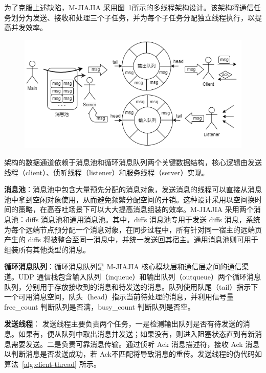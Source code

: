 {\begin{enumerate}[label=\arabic*.]
              为了克服上述缺陷，M-JIAJIA 采用图~\ref{fig:mjiajia-multithread}所示的多线程架构设计。该架构将通信任务划分为发送、接收和处理三个子任务，并为每个子任务分配独立线程执行，以提高并发效率。
              \begin{figure}[H]
                  \centering
                  \includegraphics[width=1.0\textwidth]{Img/Multithread-arch.png}
                  \label{fig:mjiajia-multithread}
              \end{figure}

              架构的数据通道依赖于消息池和循环消息队列两个关键数据结构，核心逻辑由发送线程（client）、侦听线程（listener）和服务线程（server）实现。

              \textbf{消息池}：消息池中包含大量预先分配的消息对象，发送消息的线程可以直接从消息池中拿到空闲对象使用，从而避免频繁分配空间的开销。这种设计采用以空间换时间的策略，在高吞吐场景下可以大大提高消息组装的效率。M-JIAJIA 采用两个消息池：diffs 消息池和通用消息池。其中，diffs 消息池专用于发送 diffs 消息，系统为每个远端节点预分配一个消息对象，在同步过程中，所有针对同一宿主的远端页产生的 diffs 将被整合至同一消息中，并统一发送回其宿主。通用消息池则可用于组装所有其他类型的消息。

              \textbf{循环消息队列}：循环消息队列是 M-JIAJIA 核心模块层和通信层之间的通信渠道。UDP 通信栈包含输入队列（inqueue）和输出队列（outqueue）两个循环消息队列，分别用于存放接收到的消息和待发送的消息。队列使用队尾（tail）指示下一个可用消息空间，队头（head）指示当前待处理的消息，并利用信号量free\_count 判断队列是否满，busy\_count 判断队列是否空。

              \textbf{发送线程}： 发送线程主要负责两个任务，一是检测输出队列是否有待发送的消息。如果有，便从队列中取出消息并发送；如果没有，则进入阻塞状态直到有新消息需要发送。二是负责可靠消息传输。通过侦听 Ack 消息描述符，接收 Ack 消息以判断消息是否发送成功，若 Ack不匹配将导致消息的重传。发送线程的伪代码如算法~\ref{alg:client-thread} 所示。


\end{enumerate}}
